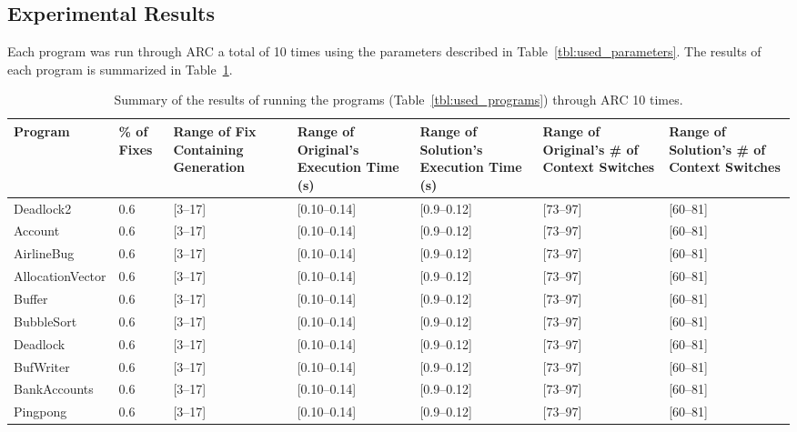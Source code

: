 \documentclass[10pt, conference, compsocconf]{IEEEtran}
\begin{document}
\subsection{Experimental Results}
\label{sec:experimental_results}

Each program was run through ARC a total of 10 times using the parameters
described in Table~\ref{tbl:used_parameters}. The results of each
program is summarized in Table~\ref{tbl:summary_results}. %

\begin{table}[!t]
\begin{center}
\begin{tabular}{|p{2cm}|p{0.6cm}|p{1.75cm}|p{2cm}|p{2cm}|p{2cm}|p{2cm}|}
\hline
\textbf{Program} &
\textbf{\% of Fixes} &
\textbf{Range of Fix Containing Generation} &
\textbf{Range of Original's Execution Time (s)} &
\textbf{Range of Solution's Execution Time (s)} &
\textbf{Range of Original's \# of Context Switches} &
\textbf{Range of Solution's \# of Context Switches}
\\\hline
Deadlock2 & 0.6 & [3--17] & [0.10--0.14] & [0.9--0.12] & [73--97] & [60--81]
\\\hline
Account & 0.6 & [3--17] & [0.10--0.14] & [0.9--0.12] & [73--97] & [60--81]
\\\hline
AirlineBug & 0.6 & [3--17] & [0.10--0.14] & [0.9--0.12] & [73--97] & [60--81]
\\\hline
AllocationVector & 0.6 & [3--17] & [0.10--0.14] & [0.9--0.12] & [73--97] & [60--81]
\\\hline
Buffer & 0.6 & [3--17] & [0.10--0.14] & [0.9--0.12] & [73--97] & [60--81]
\\\hline
BubbleSort & 0.6 & [3--17] & [0.10--0.14] & [0.9--0.12] & [73--97] & [60--81]
\\\hline
Deadlock & 0.6 & [3--17] & [0.10--0.14] & [0.9--0.12] & [73--97] & [60--81]
\\\hline
BufWriter & 0.6 & [3--17] & [0.10--0.14] & [0.9--0.12] & [73--97] & [60--81]
\\\hline
BankAccounts & 0.6 & [3--17] & [0.10--0.14] & [0.9--0.12] & [73--97] & [60--81]
\\\hline
Pingpong & 0.6 & [3--17] & [0.10--0.14] & [0.9--0.12] & [73--97] & [60--81]
\\\hline
\end{tabular}
\caption{Summary of the results of running the programs (Table~\ref{tbl:used_programs}) through ARC 10 times.}
\label{tbl:summary_results}
\end{center}
\end{table}
\end{document}
